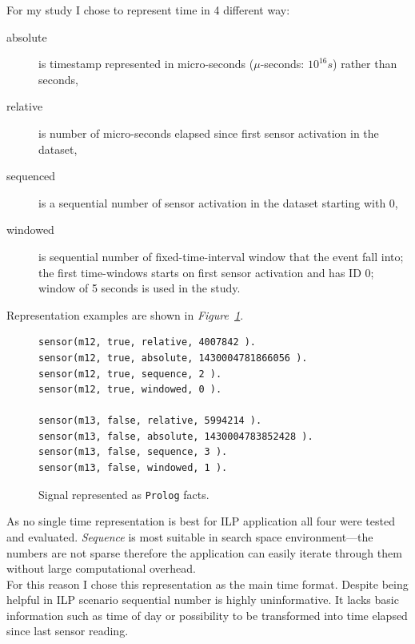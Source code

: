 \documentclass[10pt, a4paper, pdflatex, leqno, twoside, openright]{report}
\begin{document}
For my study I chose to represent time in 4 different way:
\begin{description}
\item[absolute] is timestamp represented in micro-seconds ($\mu$-seconds: $10^{16}s$) rather than seconds,
\item[relative] is number of micro-seconds elapsed since first sensor activation in the dataset,
\item[sequenced] is a sequential number of sensor activation in the dataset starting with $0$,
\item[windowed] is sequential number of fixed-time-interval window that the event fall into; the first time-windows starts on first sensor activation and has ID $0$; window of 5 seconds is used in the study.
\end{description}
Representation examples are shown in \emph{Figure~\ref{lst:timerepresentation}}.\\

\begin{figure}[htb] %
  \begin{verbatim}
sensor(m12, true, relative, 4007842 ).
sensor(m12, true, absolute, 1430004781866056 ).
sensor(m12, true, sequence, 2 ).
sensor(m12, true, windowed, 0 ).

sensor(m13, false, relative, 5994214 ).
sensor(m13, false, absolute, 1430004783852428 ).
sensor(m13, false, sequence, 3 ).
sensor(m13, false, windowed, 1 ).
  \end{verbatim}
  \caption{Signal represented as \texttt{Prolog} facts.\label{lst:timerepresentation}}
\end{figure}

As no single time representation is best for ILP application all four were tested and evaluated. \emph{Sequence} is most suitable in search space environment---the numbers are not sparse therefore the application can easily iterate through them without large computational overhead.\\
For this reason I chose this representation as the main time format. Despite being helpful in ILP scenario sequential number is highly uninformative. It lacks basic information such as time of day or possibility to be transformed into time elapsed since last sensor reading.\\
\end{document}
